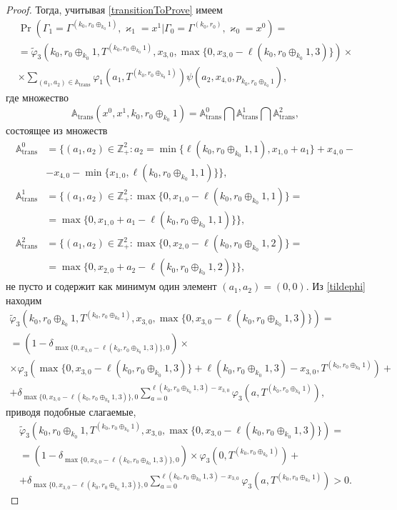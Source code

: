 \documentclass[a4paper,12pt,russian]{extarticle}
\begin{document}
\begin{proof}
Тогда, учитывая \eqref{transitionToProve} имеем
\begin{multline*}
\Pr (\Gamma_{1}=\Gamma^{(k_0,r_0\oplus_{k_0}1)},\varkappa_{1}=x^1 | \Gamma_{0}=\Gamma^{(k_0,r_0)},\varkappa_0=x^0)=\\
=\widetilde{\varphi}_3(k_0,r_0\oplus_{k_0}1,T^{(k_0,r_0\oplus_{k_0}1)},x_{3,0},\max{\{0,x_{3,0} - \ell(k_0,r_0\oplus_{k_0}1,3)\}})\times \\
\times
\sum_{(a_1,a_2)\in {\mathbb A}_{\mathrm{trans}}}\varphi_1(a_1,T^{(k_0,r_0\oplus_{k_0}1)})  \psi(a_2,x_{4,0}, p_{k_0,r_0\oplus_{k_0}1}),
\end{multline*}
где множество 
\begin{equation*}
{\mathbb A}_{\mathrm{trans}}(x^0,x^1,k_0,r_0\oplus_{k_0}1) = {\mathbb A}_{\mathrm{trans}}^0 \bigcap {\mathbb A}_{\mathrm{trans}}^1\bigcap {\mathbb A}_{\mathrm{trans}}^2,
\end{equation*}
состоящее из множеств 
\begin{align*}
{\mathbb A}_{\mathrm{trans}}^0 &= \{(a_1,a_2) \in \mathbb{Z}_+^2 \colon a_2 = \min{\{\ell(k_0,r_0\oplus_{k_0}1,1), x_{1,0}+a_1}\} +x_{4,0}- \\ 
&-x_{4,0} - \min{\{x_{1,0}, \ell(k_0,r_0\oplus_{k_0}1,1)\}}\},\\
{\mathbb A}_{\mathrm{trans}}^1 &= \{(a_1,a_2) \in \mathbb{Z}_+^2 \colon \max{\{0,x_{1,0} - \ell(k_0,r_0\oplus_{k_0}1,1)\}}=\\
&=\max{\{0,x_{1,0}+a_1-\ell(k_0,r_0\oplus_{k_0}1,1)\}}\},\\
 {\mathbb A}_{\mathrm{trans}}^2 &= \{(a_1,a_2) \in \mathbb{Z}_+^2 \colon  \max{\{0,x_{2,0} - \ell(k_0,r_0\oplus_{k_0}1,2)\}}=\\
 &=\max{\{0,x_{2,0}+a_2-\ell(k_0,r_0\oplus_{k_0}1,2)\}}\},
\end{align*}
не пусто и содержит как минимум один элемент $(a_1,a_2)=(0,0)$. Из \eqref{tildephi} находим
\begin{multline*}
\widetilde{\varphi}_3(k_0,r_0\oplus_{k_0}1,T^{(k_0,r_0\oplus_{k_0}1)},x_{3,0},\max{\{0,x_{3,0} - \ell(k_0,r_0\oplus_{k_0}1,3)\}})= \\=(1-\delta_{\max{\{0,x_{3,0} - \ell(k_0,r_0\oplus_{k_0}1,3)\}},0}) \times \\\times\varphi_3(\max{\{0,x_{3,0} - \ell(k_0,r_0\oplus_{k_0}1,3)\}} + \ell (k_0,r_0\oplus_{k_0}1,3) - x_{3,0},T^{(k_0,r_0\oplus_{k_0}1)} ) +\\
+\delta_{\max{\{0,x_{3,0} - \ell(k_0,r_0\oplus_{k_0}1,3)\}},0} \sum_{a=0}^{\ell(k_0,r_0\oplus_{k_0}1,3)-x_{3,0}}\varphi_3 (a,T^{(k_0,r_0\oplus_{k_0}1)}),
\end{multline*}
приводя подобные слагаемые,
\begin{multline*}
\widetilde{\varphi}_3(k_0,r_0\oplus_{k_0}1,T^{(k_0,r_0\oplus_{k_0}1)},x_{3,0},\max{\{0,x_{3,0} - \ell(k_0,r_0\oplus_{k_0}1,3)\}})=\\=(1-\delta_{\max{\{0,x_{3,0} - \ell(k_0,r_0\oplus_{k_0}1,3)\}},0}) \times \varphi_3(0,T^{(k_0,r_0\oplus_{k_0}1)} ) +\\
+\delta_{\max{\{0,x_{3,0} - \ell(k_0,r_0\oplus_{k_0}1,3)\}},0} \sum_{a=0}^{\ell(k_0,r_0\oplus_{k_0}1,3)-x_{3,0}}\varphi_3 (a,T^{(k_0,r_0\oplus_{k_0}1)})>0.
\end{multline*}


\end{proof}
\end{document}
